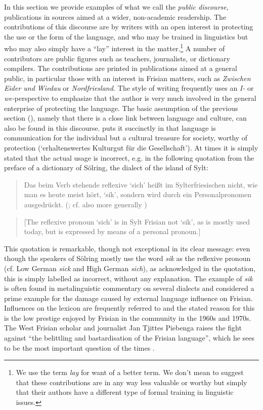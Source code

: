 \documentclass[output=paper]{langsci/langscibook}
\begin{document}
In this section we provide examples of what we call the \textit{public discourse}, publications in sources aimed at a wider, non-academic readership. The contributions of this discourse are by writers with an open interest in protecting the use or the form of the language, and who may be trained in linguistics but who may also simply have a “lay” interest in the matter.\footnote{We use the term \textit{lay} for want of a better term. We don’t mean to suggest that these contributions are in any way less valuable or worthy but simply that their authors have a different type of formal training in linguistic issues.} A number of contributors are public figures such as teachers, journalists, or dictionary compilers. The contributions are printed in publications aimed at a general public, in particular those with an interest in Frisian matters, such as \textit{Zwischen Eider und Wiedau} or \textit{Nordfriesland.} The style of writing frequently uses an \textit{I-} or \textit{we-}perspective to emphasize that the author is very much involved in the general enterprise of protecting the language. The basic assumption of the previous section (), namely that there is a close link between language and culture, can also be found in this discourse. \citet{Holander1969} puts it succinctly in that language is communication for the individual but a cultural treasure for society, worthy of protection (‘erhaltenswertes Kulturgut für die Gesellschaft’). At times it is simply stated that the actual usage is incorrect, e.g. in the following quotation from the preface of a dictionary of Sölring, the dialect of the island of Sylt: 

\begin{quote}
Das beim Verb stehende reflexive ‘sich’ heißt im Sylterfriesischen nicht, wie man es heute meist hört, ‘sik’, sondern wird durch ein Personalpronomen ausgedrückt. (\citealt{Schmidt1972}; cf. also more generally \citealt{BosseLanger2021})
\end{quote}

\begin{quote}
[The reflexive pronoun ‘sich’ is in Sylt Frisian not ‘sik’, as is mostly used today, but is expressed by means of a personal pronoun.]
\end{quote}

This quotation is remarkable, though not exceptional in its clear message: even though the speakers of Sölring mostly use the word \textit{sik} as the reflexive pronoun (cf. Low German \textit{sick} and High German \textit{sich}), as acknowledged in the quotation, this is simply labelled as incorrect, without any explanation. The example of \textit{sik} is often found in metalinguistic commentary on several dialects and considered a prime example for the damage caused by external language influence on Frisian. Influences on the lexicon are frequently referred to and the stated reason for this is the low prestige enjoyed by Frisian in the community in the 1960s and 1970s. The West Frisian scholar and journalist Jan Tjittes Piebenga raises the fight against “the belittling and bastardisation of the Frisian language”, which he sees to be the most important question of the times \citep[11]{Piebenga1966}. 
\end{document}
